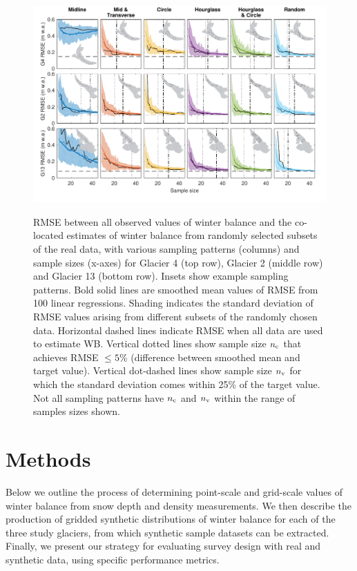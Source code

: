 \documentclass{article}
\begin{document}
\begin{figure}
	\centering
	\includegraphics[width =\textwidth]{Pulwicki_Fig5.pdf}\\
	\caption{RMSE between all observed values of winter balance and the co-located estimates of winter balance from randomly selected subsets of the real data, with various sampling patterns (columns) and sample sizes (x-axes) for Glacier 4 (top row), Glacier 2 (middle row) and Glacier 13 (bottom row). Insets show example sampling patterns. Bold solid lines are smoothed mean values of RMSE from 100 linear regressions. Shading indicates the standard deviation of RMSE values arising from different subsets of the randomly chosen data. Horizontal dashed lines indicate RMSE when all data are used to estimate WB.  Vertical dotted lines show sample size $n_{\rm c}$ that achieves RMSE $\leq 5$\% (difference between smoothed mean and target value). Vertical dot-dashed lines show sample size $n_{\rm v}$ for which the standard deviation comes within 25\% of the target value. Not all sampling patterns have $n_{\rm c}$ and $n_{\rm v}$ within the range of samples sizes shown.}
	\label{fig:RealObsWB}
\end{figure}


\section{Methods}

Below we outline the process of determining point-scale and grid-scale values of winter balance from snow depth and density measurements. We then describe the production of gridded synthetic distributions of winter balance for each of the three study glaciers, from which synthetic sample datasets can be extracted. Finally, we present our strategy for evaluating survey design with real and synthetic data, using specific performance metrics. 
\end{document}

